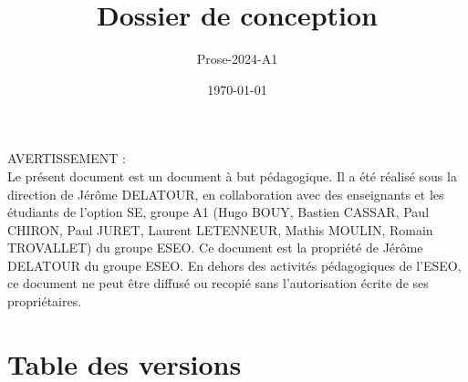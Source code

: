 \documentclass[a4paper,11pt,titlepage,dvipsnames]{article}
\author{Prose-2024-A1}        %
\title{Dossier de conception}     %
\date{\normalsize\today}    %
\begin{document}
\maketitle

\BgThispage %
\vspace*{\fill}
\noindent
AVERTISSEMENT : \\
Le présent document est un document à but pédagogique.
Il a été réalisé sous la direction de Jérôme DELATOUR, en collaboration avec des enseignants et les étudiants de l'option SE, groupe A1 (Hugo BOUY, Bastien CASSAR, Paul CHIRON, Paul JURET, Laurent LETENNEUR, Mathis MOULIN, Romain TROVALLET) du groupe ESEO.
Ce document est la propriété de Jérôme DELATOUR du groupe ESEO. En dehors des activités pédagogiques de l'ESEO, ce document ne peut être diffusé ou recopié sans l'autorisation écrite de ses propriétaires.
\vspace*{\fill}
\clearpage

\section*{Table des versions}
 \label{TableOfVersion} %
\clearpage

\tableofcontents %












\newpage
\listoffigures \label{TableOfFigure} %


\clearpage %
\null
\thispagestyle{empty}%
\addtocounter{page}{-1}%
\BgThispage
\end{document}
